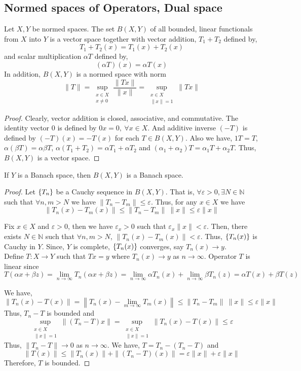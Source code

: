 \subsection{Normed spaces of Operators, Dual space}
\begin{definition}[$B(X,Y)$]
	Let $X,Y$ be normed spaces.
	The set $B(X,Y)$ of all bounded, linear functionals from $X$ into $Y$ is a vector space together with vector addition, $T_1 + T_2$ defined by,
	\[ T_1+T_2(x) = T_1(x) + T_2(x) \]
	and scalar multiplication $\alpha T$ defined by,
	\[ (\alpha T)(x) = \alpha T(x) \]
	In addition, $B(X,Y)$ is a normed space with norm
	\[ \|T\| = \sup_{\substack{x \in X\\x \ne 0}} \frac{\|Tx\|}{\|x\|} = \sup_{\substack{x \in X\\ \|x\| = 1}} \| Tx\| \]
\end{definition}
\begin{proof}
	Clearly, vector addition is closed, associative, and commutative.
	The identity vector $0$ is defined by $0x = 0,\ \forall x \in X$.
	And additive inverse $(-T)$ is defined by $(-T)(x) = -T(x)$ for each $T \in B(X,Y)$.
	Also we have, $1T = T$, $\alpha(\beta T) = \alpha \beta T$, $\alpha(T_1+T_2)= \alpha T_1 + \alpha T_2$ and $(\alpha_1 + \alpha_2)T = \alpha_1  T + \alpha_2 T$.
	Thus, $B(X,Y)$ is a vector space.
\end{proof}
\begin{theorem}
	If $Y$ is a Banach space, then $B(X,Y)$ is a Banach space.
\end{theorem}
\begin{proof}
	Let $\left\{T_n\right\}$ be a Cauchy sequence in $B(X,Y)$.
	That is, $\forall \varepsilon > 0, \exists N \in \mathbb{N}$ such that $\forall n,m > N$ we have $\| T_n - T_m \| \le \varepsilon$.
	Thus, for any $x \in X$ we have
	\[ \|T_n(x) - T_m(x) \| \le \|T_n-T_m\| \  \|x\| \le \varepsilon \|x\| \]
	
	Fix $x \in X$ and $\varepsilon > 0$, then we have $\varepsilon_x > 0$ such that $\varepsilon_x \|x\| < \varepsilon$.
	Then, there exists $N \in \mathbb{N}$ such that $\forall n,m > N$, $\|T_n(x) - T_m(x)\| < \varepsilon$.
	Thus, $\left\{T_n(x)\right\}$ is Cauchy in $Y$.
	Since, $Y$ is complete, $\left\{T_n(x)\right\}$ converges, say $T_n(x) \to y$.\\

	Define $T : X \to Y$ such that $Tx = y$ where $T_n(x) \to y$ as $n \to \infty$.
	Operator $T$ is linear since
	\[ T(\alpha x + \beta z) = \lim_{n \to \infty} T_n(\alpha x + \beta z) = \lim_{n \to \infty} \alpha T_n(x) + \lim_{n \to \infty}\beta T_n(z)  = \alpha T(x) + \beta T(z) \]

	We have,
	\[ \| T_n(x) - T(x) \| = \left\| T_n(x) - \lim_{m \to \infty} T_m(x) \right\| \le \|T_n-T_m\| \ \|x\| \le \varepsilon \|x\| \]
	Thus, $T_n-T$ is bounded and 
	\[ \sup_{\substack{x \in X\\ \|x\| = 1}} \|(T_n-T)x\| = \sup_{\substack{x \in X\\ \|x\|=1}}\| T_n(x) - T(x) \| \le \varepsilon \]
	Thus, $\|T_n-T\| \to 0$ as $n \to \infty$.
	We have, $T = T_n - (T_n-T)$ and \[ \|T(x)\| \le \|T_n(x)\| + \|(T_n-T)(x)\| = \varepsilon \|x\| + \varepsilon \|x\|\]
	Therefore, $T$ is bounded.
\end{proof}


